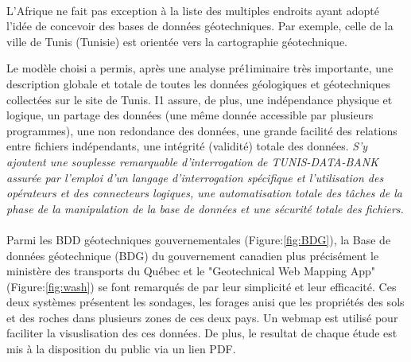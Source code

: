 
\paragraph{}
L'Afrique ne fait pas exception à la liste des multiples endroits ayant adopté l'idée
de concevoir des bases de données géotechniques.
Par exemple, celle de la ville de Tunis (Tunisie) est orientée vers la cartographie géotechnique.
\par
Le modèle choisi a permis, après une analyse
pré1iminaire très importante, une description globale et
totale de toutes les données géologiques et géotechniques collectées sur le site de Tunis. I1
assure, de plus, une indépendance physique et logique, un partage des données (une même donnée accessible  
par plusieurs programmes), une non redondance des données, une grande facilité des relations
entre fichiers indépendants, une intégrité (validité)
totale des données. 
\textit{S'y ajoutent une souplesse remarquable d'interrogation de TUNIS-DATA-BANK
assurée par l'emploi d'un langage d'interrogation spécifique et l'utilisation des opérateurs et des connecteurs
logiques, une automatisation totale des tâches de la
phase de la manipulation de la base de données et une
sécurité totale des fichiers.}
\cite{mongereau1988conception}

\paragraph{} 
Parmi les BDD géotechniques gouvernementales (Figure:\ref{fig:BDG}), la Base de données géotechnique
(BDG) du gouvernement canadien plus précisément le
ministère des transports du Québec et le "Geotechnical Web Mapping App" (Figure:\ref{fig:wash}) se font remarqués
de par leur simplicité et leur efficacité. Ces deux systèmes présentent les sondages, les forages anisi que les 
propriétés des sols et des roches dans plusieurs zones de ces deux pays.
Un webmap est utilisé pour faciliter la visuslisation des ces données.
De plus, le resultat de chaque étude est mis à la disposition du public
via un lien PDF.

